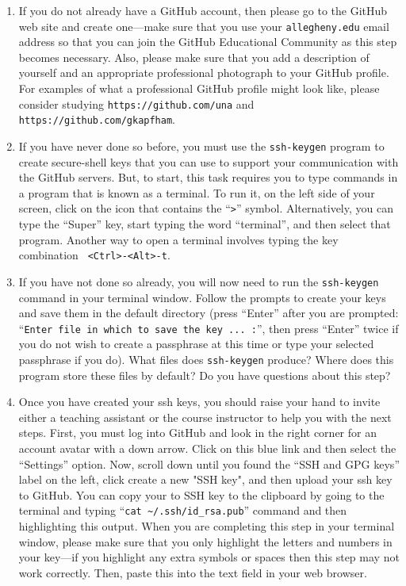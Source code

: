 \begin{enumerate}

  \item If you do not already have a GitHub account, then please go to the GitHub web site and create one---make
    sure that you use your {\tt allegheny.edu} email address so that you can join the GitHub Educational Community as
    this step becomes necessary. Also, please make sure that you add a description of yourself and an appropriate
    professional photograph to your GitHub profile. For examples of what a professional GitHub profile might look like,
    please consider studying {\tt https://github.com/una} and {\tt https://github.com/gkapfham}.

  \item If you have never done so before, you must use the {\tt ssh-keygen} program to create secure-shell keys that you
    can use to support your communication with the GitHub servers. But, to start, this task requires you to type
    commands in a program that is known as a terminal. To run it, on the left side of your screen, click on the icon
    that contains the ``{\tt >}'' symbol. Alternatively, you can type the ``Super'' key, start typing the word
    ``terminal'', and then select that program. Another way to open a terminal involves typing the key combination {\tt
    <Ctrl>-<Alt>-t}.

  \item If you have not done so already, you will now need to run the {\tt ssh-keygen} command in your terminal window.
    Follow the prompts to create your keys and save them in the default directory (press ``Enter'' after you are
    prompted: ``{\tt Enter file in which to save the key ...  :}'', then press ``Enter'' twice if you do not wish to
    create a passphrase at this time or type your selected passphrase if you do). What files does {\tt ssh-keygen}
    produce? Where does this program store these files by default? Do you have questions about this step?

  \item Once you have created your ssh keys, you should raise your hand to invite either a teaching assistant or the
    course instructor to help you with the next steps. First, you must log into GitHub and look in the right corner for
    an account avatar with a down arrow. Click on this blue link and then select the ``Settings'' option. Now, scroll
    down until you found the ``SSH and GPG keys'' label on the left, click create a new "SSH key", and then upload your
    ssh key to GitHub. You can copy your to SSH key to the clipboard by going to the terminal and typing ``{\tt cat
    \textasciitilde{}/.ssh/id\_rsa.pub}'' command and then highlighting this output. When you are completing this step
    in your terminal window, please make sure that you only highlight the letters and numbers in your key---if you
    highlight any extra symbols or spaces then this step may not work correctly. Then, paste this into the text field in
    your web browser.


\end{enumerate}
